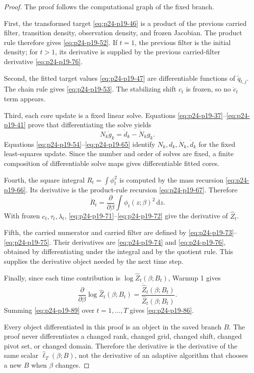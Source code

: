 \documentclass[11pt]{article}
\newcommand{\dd}{\,\mathrm d}
\newcommand{\widehatell}{\widehat\ell}
\begin{document}
\begin{proof}
The proof follows the computational graph of the fixed branch.

First, the transformed target \eqref{eq:p24-p19-46} is a product of the previous carried filter,
transition density, observation density, and frozen Jacobian.  The product rule
therefore gives \eqref{eq:p24-p19-52}.  If \(t=1\), the previous filter is the initial density;
for \(t>1\), its derivative is supplied by the previous carried-filter
derivative \eqref{eq:p24-p19-76}.

Second, the fitted target values \eqref{eq:p24-p19-47} are differentiable functions of
\(\widetilde q_{t,j}\).  The chain rule gives \eqref{eq:p24-p19-53}.  The stabilizing shift
\(c_t\) is frozen, so no \(\dot c_t\) term appears.

Third, each core update is a fixed linear solve.  Equations \eqref{eq:p24-p19-37}--\eqref{eq:p24-p19-41} prove
that differentiating the solve yields
\[
    N_k\dot g_k=\dot d_k-\dot N_k g_k.
    \label{eq:p24-p19-87}
\]
Equations \eqref{eq:p24-p19-54}--\eqref{eq:p24-p19-65} identify \(N_k,d_k,\dot N_k,\dot d_k\) for the fixed
least-squares update.  Since the number and order of solves are fixed, a finite
composition of differentiable solve maps gives differentiable fitted cores.

Fourth, the square integral \(R_t=\int\phi_t^2\) is computed by the mass
recursion \eqref{eq:p24-p19-66}.  Its derivative is the product-rule recursion \eqref{eq:p24-p19-67}.  Therefore
\[
    \dot R_t=\frac{\partial}{\partial\beta}
    \int\phi_t(z;\beta)^2\dd z.
    \label{eq:p24-p19-88}
\]
With frozen \(c_t,\tau_t,\lambda_t\), \eqref{eq:p24-p19-71}--\eqref{eq:p24-p19-72} give the derivative of
\(\widehat Z_t\).

Fifth, the carried numerator and carried filter are defined by \eqref{eq:p24-p19-73}--\eqref{eq:p24-p19-75}.
Their derivatives are \eqref{eq:p24-p19-74} and \eqref{eq:p24-p19-76}, obtained by differentiating under the
integral and by the quotient rule.  This supplies the derivative object needed
by the next time step.

Finally, since each time contribution is \(\log\widehat Z_t(\beta;B_t)\),
Warmup 1 gives
\[
    \frac{\partial}{\partial\beta}
    \log\widehat Z_t(\beta;B_t)
    =
    \frac{\dot{\widehat Z}_t(\beta;B_t)}
    {\widehat Z_t(\beta;B_t)}.
    \label{eq:p24-p19-89}
\]
Summing \eqref{eq:p24-p19-89} over \(t=1,\ldots,T\) gives \eqref{eq:p24-p19-86}.

Every object differentiated in this proof is an object in the saved branch
\(B\).  The proof never differentiates a changed rank, changed grid, changed
shift, changed pivot set, or changed domain.  Therefore the derivative is the
derivative of the same scalar \(\widehatell_T(\beta;B)\), not the derivative of
an adaptive algorithm that chooses a new \(B\) when \(\beta\) changes.
\end{proof}
\end{document}
